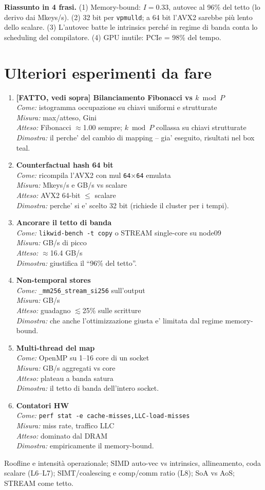 \documentclass[11pt,a4paper]{article}
\newcommand{\espitem}[5]{\item \textbf{#1}\\ \emph{Come:} #2\\ \emph{Misura:} #3\\ \emph{Atteso:} #4\\ \emph{Dimostra:} #5}
\begin{document}
\begin{difesa}
\textbf{Riassunto in 4 frasi.} (1) Memory-bound: $I=0.33$, autovec al 96\% del tetto (lo derivo dai Mkeys/s). (2) 32 bit per \texttt{vpmulld}; a 64 bit l'AVX2 sarebbe più lento dello scalare. (3) L'autovec batte le intrinsics perché in regime di banda conta lo scheduling del compilatore. (4) GPU inutile: PCIe = 98\% del tempo.
\end{difesa}

\section{Ulteriori esperimenti da fare}

\begin{espbox}
\begin{enumerate}[leftmargin=1.3em]
\espitem{[FATTO, vedi sopra] Bilanciamento Fibonacci vs $k\bmod P$}
  {istogramma occupazione su chiavi uniformi e strutturate}{max/atteso, Gini}
  {Fibonacci $\approx$1.00 sempre; $k\bmod P$ collassa su chiavi strutturate}
  {il perche' del cambio di mapping -- gia' eseguito, risultati nel box teal.}
\espitem{Counterfactual hash 64 bit}{ricompila l'AVX2 con mul \texttt{64$\times$64} emulata}{Mkeys/s e GB/s vs scalare}
  {AVX2 64-bit $\le$ scalare}{perche' si e' scelto 32 bit (richiede il cluster per i tempi).}
\espitem{Ancorare il tetto di banda}{\texttt{likwid-bench -t copy} o STREAM single-core su node09}{GB/s di picco}
  {$\approx$16.4 GB/s}{giustifica il ``96\% del tetto''.}
\espitem{Non-temporal stores}{\texttt{\_mm256\_stream\_si256} sull'output}{GB/s}{guadagno $\lesssim$25\% sulle scritture}
  {che anche l'ottimizzazione giusta e' limitata dal regime memory-bound.}
\espitem{Multi-thread del map}{OpenMP su 1--16 core di un socket}{GB/s aggregati vs core}{plateau a banda satura}
  {il tetto di banda dell'intero socket.}
\espitem{Contatori HW}{\texttt{perf stat -e cache-misses,LLC-load-misses}}{miss rate, traffico LLC}{dominato dal DRAM}
  {empiricamente il memory-bound.}
\end{enumerate}
\end{espbox}

\begin{theorybox}
Roofline e intensità operazionale; SIMD auto-vec vs intrinsics, allineamento, coda scalare (L6--L7); SIMT/coalescing e comp/comm ratio (L8); SoA vs AoS; STREAM come tetto.
\end{theorybox}
\end{document}
